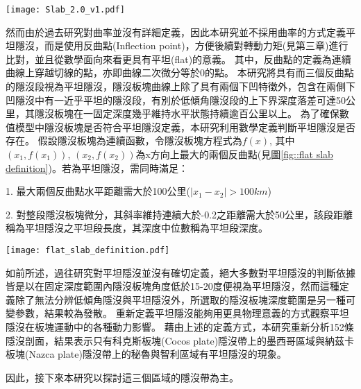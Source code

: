 \begin{figure*}[ht!]
    \centering
    \texttt{[image: Slab\_2.0\_v1.pdf]}
    \caption[slab 2.0 模型與四條參考剖面]{slab 2.0 模型與四條參考剖面}
    \label{fig::slab profile}
\end{figure*}


然而由於過去研究對曲率並沒有詳細定義，因此本研究並不採用曲率的方式定義平坦隱沒，而是使用反曲點(Inflection point)，方便後續對轉動力矩(見第三章)進行比對，並且從數學面向來看更具有平坦(flat)的意義。
其中，反曲點的定義為連續曲線上穿越切線的點，亦即曲線二次微分等於0的點。
本研究將具有而三個反曲點的隱沒段視為平坦隱沒，隱沒板塊曲線上除了具有兩個下凹特徵外，包含在兩側下凹隱沒中有一近乎平坦的隱沒段，有別於低傾角隱沒段的上下界深度落差可達50公里，其隱沒板塊在一固定深度幾乎維持水平狀態持續逾百公里以上。
為了確保數值模型中隱沒板塊是否符合平坦隱沒定義，本研究利用數學定義判斷平坦隱沒是否存在。
假設隱沒板塊為連續函數，令隱沒板塊方程式為$f(x)$, 其中$(x_{1},f(x_{1}))$, $(x_{2},f(x_{2}))$為x方向上最大的兩個反曲點(見圖\ref{fig::flat slab definition})。若為平坦隱沒，需同時滿足：

1. 最大兩個反曲點水平距離需大於100公里($\mid x_{1}-x_{2}\mid > 100 km$)

2. 對整段隱沒板塊微分，其斜率維持連續大於-0.2之距離需大於50公里，該段距離稱為平坦隱沒之平坦段長度，其深度中位數稱為平坦段深度。

\begin{figure*}[ht!]
    \centering
    \texttt{[image: flat\_slab\_definition.pdf]}
    \caption[本研究中平坦隱沒的定義示意圖。]{本研究中平坦隱沒的定義示意圖。}
    \label{fig::flat slab definition}
\end{figure*}

如前所述，過往研究對平坦隱沒並沒有確切定義，絕大多數對平坦隱沒的判斷依據皆是以在固定深度範圍內隱沒板塊角度低於15-20度便視為平坦隱沒，然而這種定義除了無法分辨低傾角隱沒與平坦隱沒外，所選取的隱沒板塊深度範圍是另一種可變參數，結果較為發散。
重新定義平坦隱沒能夠用更具物理意義的方式觀察平坦隱沒在板塊運動中的各種動力影響。
藉由上述的定義方式，本研究重新分析152條隱沒剖面，結果表示只有科克斯板塊(Cocos plate)隱沒帶上的墨西哥區域與納茲卡板塊(Nazca plate)隱沒帶上的秘魯與智利區域有平坦隱沒的現象。

因此，接下來本研究以探討這三個區域的隱沒帶為主。

